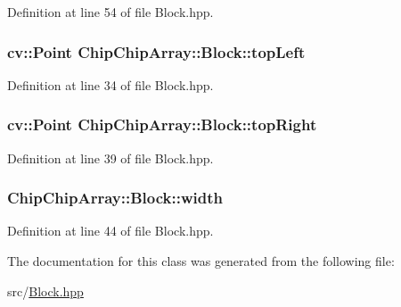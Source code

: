 Definition at line 54 of file Block.\+hpp.

\hypertarget{classChipChipArray_1_1Block_aeecc05025c6c8e23ff6ca09a6fbd4b4b}{
\subsubsection[{top\+Left}]{\setlength{\rightskip}{0pt plus 5cm}cv\+::\+Point Chip\+Chip\+Array\+::\+Block\+::top\+Left}}\label{classChipChipArray_1_1Block_aeecc05025c6c8e23ff6ca09a6fbd4b4b}


Definition at line 34 of file Block.\+hpp.

\hypertarget{classChipChipArray_1_1Block_aaa4ff82846e95a628800ebdfd3ceefb5}{
\subsubsection[{top\+Right}]{\setlength{\rightskip}{0pt plus 5cm}cv\+::\+Point Chip\+Chip\+Array\+::\+Block\+::top\+Right}}\label{classChipChipArray_1_1Block_aaa4ff82846e95a628800ebdfd3ceefb5}


Definition at line 39 of file Block.\+hpp.

\hypertarget{classChipChipArray_1_1Block_ac3f815e8aa9060c4ad20d4e1b2649e35}{
\subsubsection[{width}]{ Chip\+Chip\+Array\+::\+Block\+::width}}\label{classChipChipArray_1_1Block_ac3f815e8aa9060c4ad20d4e1b2649e35}


Definition at line 44 of file Block.\+hpp.



The documentation for this class was generated from the following file\+:\begin{DoxyCompactItemize}
\item 
src/\hyperlink{Block_8hpp}{Block.\+hpp}\end{DoxyCompactItemize}
